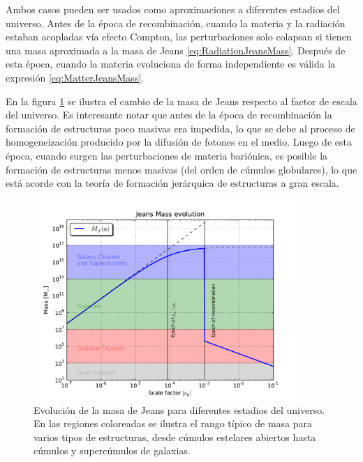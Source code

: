 	
Ambos casos pueden ser usados como aproximaciones a diferentes estadios del 
universo. Antes de la época de recombinación, cuando la materia y la 
radiación estaban acopladas vía efecto Compton, las perturbaciones solo 
colapsan si tienen una masa aproximada a la masa de Jeans 
\ref{eq:RadiationJeansMass}. Después de esta época, cuando la materia 
evoluciona de forma independiente es válida la expresión 
\ref{eq:MatterJeansMass}.


En la figura \ref{fig:JeansMass} se ilustra el cambio de la masa de Jeans
respecto al factor de escala del universo. Es interesante notar que antes 
de la época de recombinación la formación de estructuras poco masivas era
impedida, lo que se debe al proceso de homogeneización producido por la 
difusión de fotones en el medio. Luego de esta época, cuando surgen las 
perturbaciones de materia bariónica, es posible la formación de estructuras 
menos masivas (del orden de cúmulos globulares), lo que está acorde con la
teoría de formación jerárquica de estructuras a gran escala.

	
\begin{figure}[htbp]
	\centering
	\includegraphics[width=0.9\textwidth]
	{./figures/2_theoretical_framework/Jeans_Mass_Evolution.pdf}

	\caption{\small{Evolución de la masa de Jeans para diferentes estadios
	del universo. En las regiones coloreadas se ilustra el rango típico de 
	masa para varios tipos de estructuras, desde cúmulos estelares abiertos
	hasta cúmulos y supercúmulos de galaxias.}}
	
	\label{fig:JeansMass}
\end{figure}
	


